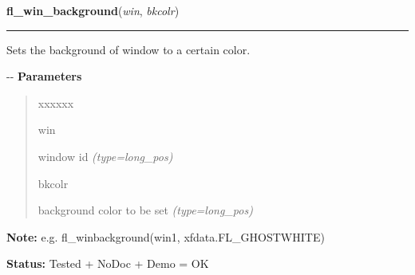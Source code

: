 \hspace{.8\funcindent}\begin{boxedminipage}{\funcwidth}

    \raggedright \textbf{fl\_win\_background}(\textit{win}, \textit{bkcolr})

    \vspace{-1.5ex}

    \rule{\textwidth}{0.5\fboxrule}
\setlength{\parskip}{2ex}

Sets the background of window to a certain color.

-{}-
\setlength{\parskip}{1ex}
      \textbf{Parameters}
      \vspace{-1ex}

      \begin{quote}
        \begin{Ventry}{xxxxxx}

          \item[win]


window id
            {\it (type=long\_pos)}

          \item[bkcolr]


background color to be set
            {\it (type=long\_pos)}

        \end{Ventry}

      \end{quote}

\textbf{Note:} 
e.g. fl\_winbackground(win1, xfdata.FL\_GHOSTWHITE)


\textbf{Status:} 
Tested + NoDoc + Demo = OK


    \end{boxedminipage}

    \label{xformslib:flxbasic:fl_winstepsize}

    \vspace{0.5ex}

